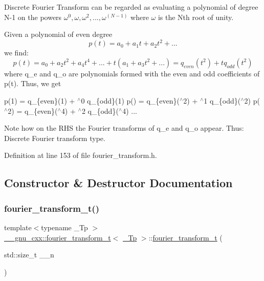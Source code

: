 Discrete Fourier Transform can be regarded as evaluating a polynomial of degree N-\/1 on the powers $ \omega^0, \omega, \omega^2, ..., \omega^(N-1) $ where $ \omega $ is the Nth root of unity.

Given a polynomial of even degree \[ p(t) = a_0 + a_1 t + a_2 t^2 + ... \] we find\+: \[ p(t) = a_0 + a_2 t^2 + a_4 t^4 + ... + t(a_1 + a_3 t^2 + ...) = q_{even}(t^2) + t q_{odd} (t^2) \] where q\+\_\+e and q\+\_\+o are polynomials formed with the even and odd coefficients of p(t). Thus, we get

p(1) = q\+\_\+\{even\}(1) + $^\wedge$0 q\+\_\+\{odd\}(1) p() = q\+\_\+\{even\}($^\wedge$2) + $^\wedge$1 q\+\_\+\{odd\}($^\wedge$2) p($^\wedge$2) = q\+\_\+\{even\}($^\wedge$4) + $^\wedge$2 q\+\_\+\{odd\}($^\wedge$4) ...

Note how on the R\+HS the Fourier transforms of q\+\_\+e and q\+\_\+o appear. Thus\+: Discrete Fourier transform type. 

Definition at line 153 of file fourier\+\_\+transform.\+h.



\subsection{Constructor \& Destructor Documentation}
\mbox{\label{class____gnu__cxx_1_1fourier__transform__t_ae9d6b51de92d52ba301457c4a9680a64}} 
\subsubsection{\texorpdfstring{fourier\+\_\+transform\+\_\+t()}{fourier\_transform\_t()}\hspace{0.1cm}{\footnotesize\ttfamily [1/2]}}
{\footnotesize\ttfamily template$<$typename \+\_\+\+Tp $>$ \\
\hyperlink{class____gnu__cxx_1_1fourier__transform__t}{\+\_\+\+\_\+gnu\+\_\+cxx\+::fourier\+\_\+transform\+\_\+t}$<$ \hyperlink{namespace____gnu__cxx_a3b19a9c800ca194374ef9172290f7d79}{\+\_\+\+Tp} $>$\+::\hyperlink{class____gnu__cxx_1_1fourier__transform__t}{fourier\+\_\+transform\+\_\+t} (\begin{DoxyParamCaption}\item[{std\+::size\+\_\+t}]{\+\_\+\+\_\+n }\end{DoxyParamCaption})\hspace{0.3cm}{\ttfamily [inline]}}



